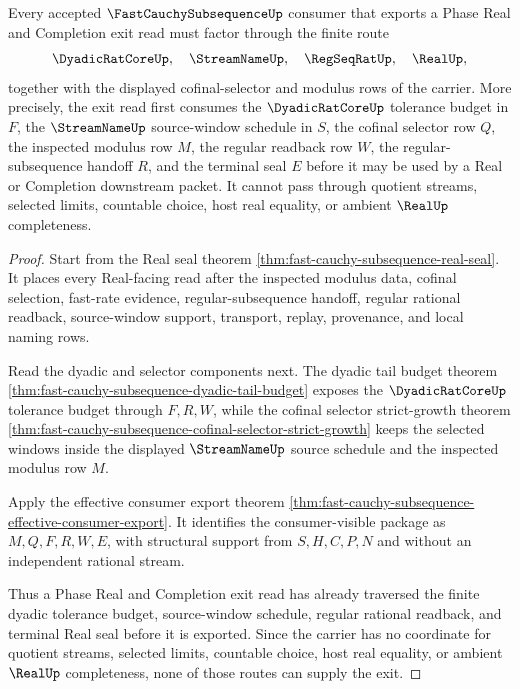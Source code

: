 \begin{theorem}
\label{thm:fast-cauchy-subsequence-phase-real-completion-exit-route}
Every accepted $\FastCauchySubsequenceUp$ consumer that exports a Phase Real and Completion exit read must factor through the finite route
$$
\DyadicRatCoreUp,\quad \StreamNameUp,\quad \RegSeqRatUp,\quad \RealUp,
$$
together with the displayed cofinal-selector and modulus rows of the carrier. More precisely, the exit read first consumes the $\DyadicRatCoreUp$ tolerance budget in $F$, the $\StreamNameUp$ source-window schedule in $S$, the cofinal selector row $Q$, the inspected modulus row $M$, the regular readback row $W$, the regular-subsequence handoff $R$, and the terminal seal $E$ before it may be used by a Real or Completion downstream packet. It cannot pass through quotient streams, selected limits, countable choice, host real equality, or ambient $\RealUp$ completeness.
\end{theorem}
\begin{proof}
Start from the Real seal theorem \autoref{thm:fast-cauchy-subsequence-real-seal}. It places every Real-facing read after the inspected modulus data, cofinal selection, fast-rate evidence, regular-subsequence handoff, regular rational readback, source-window support, transport, replay, provenance, and local naming rows.

Read the dyadic and selector components next. The dyadic tail budget theorem \autoref{thm:fast-cauchy-subsequence-dyadic-tail-budget} exposes the $\DyadicRatCoreUp$ tolerance budget through $F,R,W$, while the cofinal selector strict-growth theorem \autoref{thm:fast-cauchy-subsequence-cofinal-selector-strict-growth} keeps the selected windows inside the displayed $\StreamNameUp$ source schedule and the inspected modulus row $M$.

Apply the effective consumer export theorem \autoref{thm:fast-cauchy-subsequence-effective-consumer-export}. It identifies the consumer-visible package as $M,Q,F,R,W,E$, with structural support from $S,H,C,P,N$ and without an independent rational stream.

Thus a Phase Real and Completion exit read has already traversed the finite dyadic tolerance budget, source-window schedule, regular rational readback, and terminal Real seal before it is exported. Since the carrier has no coordinate for quotient streams, selected limits, countable choice, host real equality, or ambient $\RealUp$ completeness, none of those routes can supply the exit.
\end{proof}

